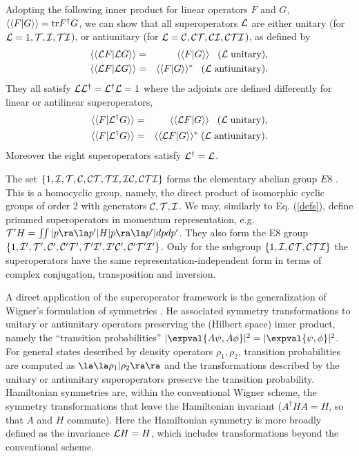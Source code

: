 Adopting the following inner product for linear operators $F$ and $G$,\linebreak $\langle\langle F|G\rangle\rangle={\rm{tr}} F^\dagger G$,
we can show that all superoperators ${\cal L}$ are either unitary (for ${\cal L}=1,{\cal T},{\cal I},{\cal TI}$), or antiunitary (for ${\cal L}={\cal C}, {\cal CT},{\cal CI},{\cal CTI}$), as defined by
%
\begin{eqnarray}
	\langle\langle {\cal L}F| {\cal L}G\rangle\rangle&=& \langle\langle F| G\rangle\rangle\;\;\;  ({\cal L}\; {\rm unitary}),
	\\
	\langle\langle {\cal L}F| {\cal L} G\rangle\rangle&=& \langle\langle  F| G\rangle\rangle^*\;\;\;  ({\cal L}\; {\rm antiunitary}).
\end{eqnarray}
%
They all satisfy ${\cal L}{\cal L}^\dagger={\cal L}^\dagger {\cal L}=1$
where the adjoints are defined differently for linear or antilinear superoperators,
\begin{eqnarray}
	\langle\langle F| {\cal L}^\dagger G\rangle\rangle&=& \langle\langle {\cal L} F| G\rangle\rangle\;\;\;  ({\cal L}\; {\rm unitary}),
	\\
	\langle\langle F| {\cal L}^\dagger G\rangle\rangle&=& \langle\langle {\cal L} F| G\rangle\rangle^*\;  ({\cal L}\; {\rm antiunitary}).
\end{eqnarray}
%
Moreover the eight superoperators  satisfy ${\cal L}^\dagger={\cal L}$.

The set $\{1, \cal{I,T,C,CT,TI,IC,CTI}\}$ forms the elementary abelian group $E8$ \cite{Rose2009}.
This is a homocyclic group, namely, the direct product of isomorphic
cyclic groups of order 2 with generators $\cal{C,T,I}$. We may, similarly to Eq. (\ref{defs}), define primmed superoperators in momentum representation, e.g. \linebreak ${\cal T'} H =\int\!\!\int |p\ra \la p'|H|p\ra\la p'| dp dp'$. They also form the E8 group \linebreak $\{1, \cal{I',T',C',C'T',T'I',I'C',C'T'I'}\}$. Only for the subgroup $\{1, \cal{I,CT,CTI}\}$ the superoperators have the same representation-independent form in terms of complex conjugation, transposition and inversion.

A direct application of the superoperator framework is the generalization of Wigner's
formulation of symmetries \cite{Wigner1959}. He associated symmetry transformations to unitary or antiunitary operators preserving the (Hilbert space) inner product, namely the ``transition probabilities'' $|\expval{A\psi,A\phi}|^2=|\expval{\psi,\phi}|^2$.
For general states described by density operators $\rho_1,\rho_2$, transition probabilities are computed as $\la\la \rho_1|\rho_2\ra\ra$
and the transformations described by the unitary or antiunitary superoperators preserve the
transition probability. Hamiltonian symmetries are, within the conventional Wigner scheme, the  symmetry transformations that leave the Hamiltonian invariant ($A^\dagger H A=H$, so that $A$ and $H$ commute). Here the Hamiltonian symmetry is more broadly defined  as
the invariance ${\cal L}H=H$, which includes transformations  beyond the conventional scheme.


